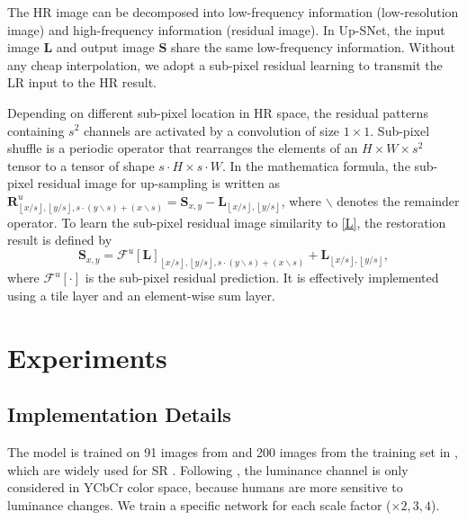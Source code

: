 \documentclass[runningheads]{llncs}
\begin{document}
The HR image can be decomposed into low-frequency information (low-resolution image) and high-frequency information (residual image). In Up-SNet, the input image $\textbf{L}$ and output image $\textbf{S}$ share the same low-frequency information. Without any cheap interpolation, we adopt a sub-pixel residual learning to transmit the LR input to the HR result.

Depending on different sub-pixel location in HR space, the residual patterns containing $s^2$ channels are activated by a convolution of size $1\times1$. Sub-pixel shuffle \cite{espcn} is a periodic operator that rearranges the elements of an $H \times W \times s^2$ tensor to a tensor of shape $s\cdot H \times s\cdot W$.
In the mathematica formula, the sub-pixel residual image for up-sampling is written as $\textbf{R}_{\left\lfloor {x/s} \right\rfloor ,\left\lfloor {y/s} \right\rfloor ,s \cdot \left( {y\backslash s} \right) + \left( {x\backslash s} \right)}^u = {\textbf{S}_{x,y}} - {\textbf{L}_{\left\lfloor {x/s} \right\rfloor ,\left\lfloor {y/s} \right\rfloor }}$, where $\backslash$ denotes the remainder operator. To learn the sub-pixel residual image similarity to \eqref{L}, the restoration result is defined by
 \begin{equation}\label{S}
 {\textbf{S}_{x,y}} = {\mathcal{F}^u}{\left[ \textbf{L} \right]_{\left\lfloor {x/s} \right\rfloor ,\left\lfloor {y/s} \right\rfloor ,s \cdot \left( {y\backslash s} \right) + \left( {x\backslash s} \right)}} + {\textbf{L}_{\left\lfloor {x/s} \right\rfloor ,\left\lfloor {y/s} \right\rfloor }},
 \end{equation}
where $\mathcal{F}^u{\left[ \cdot \right]}$ is the sub-pixel residual prediction. It is effectively implemented using a tile layer and an element-wise sum layer.

\section{Experiments}

\subsection{Implementation Details}
The model is trained on 91 images from \cite{sc} and 200 images from the training set in \cite{b100}, which are widely used for SR \cite{vdsr,drcn,drrn,memnet}. Following \cite{srcnn}, the luminance channel is only considered in YCbCr color space, because humans are more sensitive to luminance changes. We train a specific network for each scale factor ($\times 2, 3, 4$).
\end{document}
